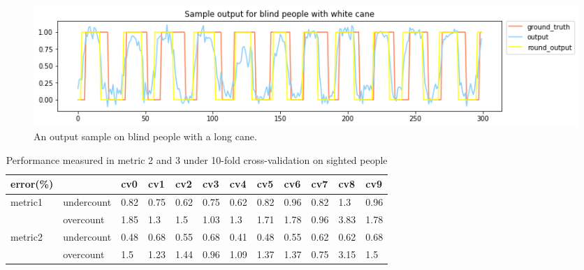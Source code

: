\documentclass[11pt]{article}
\begin{document}
\begin{figure}[ht]
\centering
\includegraphics[scale=0.5]{output_wc_2}
\caption{An output sample on blind people with a long cane.}
\label{fig:output_wc_2}
\end{figure}




\begin{table}[]
\centering
\caption{Performance measured in metric 2 and 3 under 10-fold cross-validation on sighted people}
\label{label_metric23_sighted}
\begin{tabular}{llllllllllll}
\hline
error(\%)                &            & cv0   & cv1   & cv2   & cv3   & cv4   & cv5   & cv6   & cv7   & cv8   & cv9  \\ \hline
metric1                  & undercount & 0.82  & 0.75  & 0.62  & 0.75  & 0.62  & 0.82  & 0.96  & 0.82  & 1.3   & 0.96 \\
                         & overcount  & 1.85  & 1.3   & 1.5   & 1.03  & 1.3   & 1.71  & 1.78  & 0.96  & 3.83  & 1.78 \\ \hline
\multirow{2}{*}{metric2} & undercount & 0.48  & 0.68  & 0.55  & 0.68  & 0.41  & 0.48  & 0.55  & 0.62  & 0.62  & 0.68 \\
                         & overcount  & 1.5   & 1.23  & 1.44  & 0.96  & 1.09  & 1.37  & 1.37  & 0.75  & 3.15  & 1.5  \\ \hline
\end{tabular}
\end{table}
\end{document}
